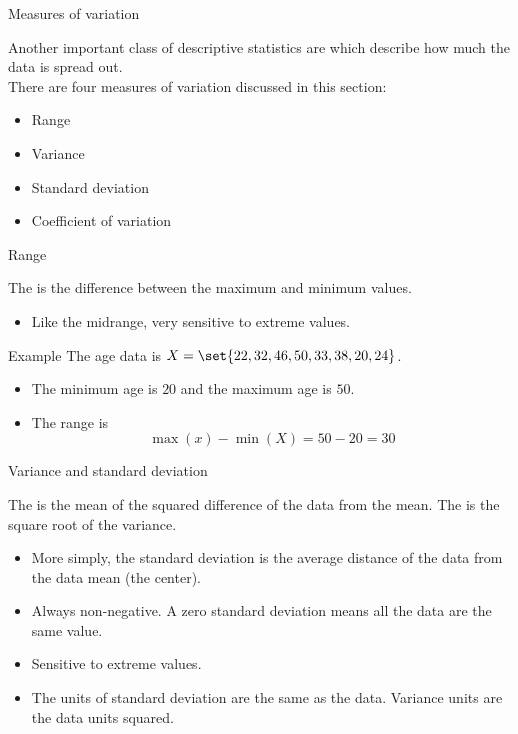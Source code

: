 \documentclass[xcolor=table, handout]{beamer}
\begin{document}
\begin{frame}{Measures of variation}
\begin{block}{}
Another important class of descriptive statistics are  which describe how much the data is spread out.\\
\medskip
There are four measures of variation discussed in this section:
\begin{itemize}
\item Range
\item Variance
\item Standard deviation
\item Coefficient of variation
\end{itemize}

\end{block}
\end{frame}

\begin{frame}{Range}
\begin{block}{}
The  is the difference between the maximum and minimum values.
\begin{itemize}
\item Like the midrange, very sensitive to extreme values.
\end{itemize}
\end{block}

\pause
\begin{exampleblock}{Example}
The age data is $X = \set{22, 32, 46, 50, 33, 38, 20, 24}$.
\begin{itemize}
\item The minimum age is $20$ and the maximum age is $50$.
\pause
\item The range is 
\[\max(x) - \min(X) = 50 - 20 = 30\]
\end{itemize}
\smallskip
\end{exampleblock}

\end{frame}

\begin{frame}{Variance and standard deviation}
\begin{block}{}
The  is the mean of the squared difference of the data from the mean. The  is the square root of the variance.
\begin{itemize}
\item More simply, the standard deviation is the average distance of the data from the data mean (the center).
\item Always non-negative. A zero standard deviation means all the data are the same value.
\item Sensitive to extreme values.
\item The units of standard deviation are the same as the data. Variance units are the data units squared.
\end{itemize}
\end{block}
\end{frame}
\end{document}
